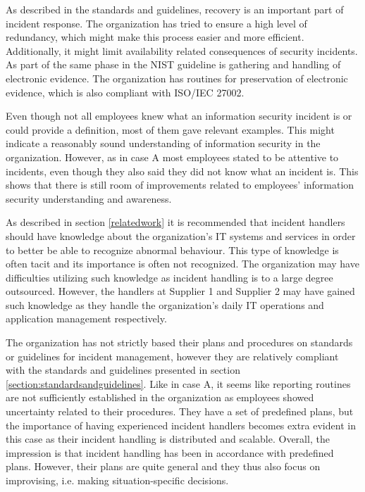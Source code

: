As described in the standards and guidelines, recovery is an important part of incident response. The organization has tried to ensure a high level of redundancy, which might make this process easier and more efficient. Additionally, it might limit availability related consequences of security incidents. As part of the same phase in the NIST guideline is gathering and handling of electronic evidence. The organization has routines for preservation of electronic evidence, which is also compliant with ISO/IEC 27002.

Even though not all employees knew what an information security incident is or could provide a definition, most of them gave relevant examples. This might indicate a reasonably sound understanding of information security in the organization. However, as in case A most employees stated to be attentive to incidents, even though they also said they did not know what an incident is. This shows that there is still room of improvements related to employees' information security understanding and awareness.

As described in section \ref{relatedwork} it is recommended that incident handlers should have knowledge about the organization's IT systems and services in order to better be able to recognize abnormal behaviour. This type of knowledge is often tacit and its importance is often not recognized. The organization may have difficulties utilizing such knowledge as incident handling is to a large degree outsourced. However, the handlers at Supplier 1 and Supplier 2 may have gained such knowledge as they handle the organization's daily IT operations and application management respectively. %

The organization has not strictly based their plans and procedures on standards or guidelines for incident management, however they are relatively compliant with the standards and guidelines presented in section \ref{section:standardsandguidelines}. Like in case A, it seems like reporting routines are not sufficiently established in the organization as employees showed uncertainty related to their procedures. They have a set of predefined plans, but the importance of having experienced incident handlers becomes extra evident in this case as their incident handling is distributed and scalable. Overall, the impression is that incident handling has been in accordance with predefined plans. However, their plans are quite general and they thus also focus on improvising, i.e. making situation-specific decisions. 

